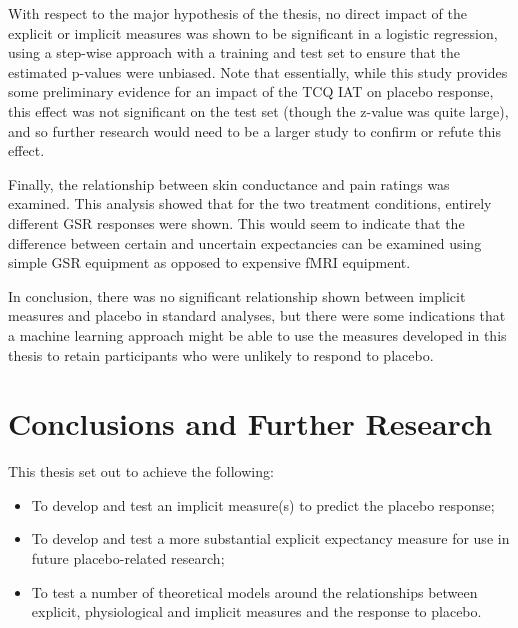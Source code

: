 With respect to the major hypothesis of the thesis, no direct impact of the explicit or implicit measures was shown to be significant in a logistic regression, using a step-wise approach with a training and test set to ensure that the estimated p-values were unbiased. Note that essentially, while this study provides some preliminary evidence for an impact of the TCQ IAT on placebo response, this effect was not significant on the test set (though the z-value was quite large), and so further research would need to be a larger study to confirm or refute this effect. 


Finally, the relationship between skin conductance and pain ratings was examined. This analysis showed that for the two treatment conditions, entirely different GSR responses were shown. This would seem to indicate that the difference between certain and uncertain expectancies can be examined using simple GSR equipment as opposed to expensive fMRI equipment. 

In conclusion, there was no significant relationship shown between implicit measures and placebo in standard analyses, but there were some indications that a machine learning approach might be able to use the measures developed in this thesis to retain participants who were unlikely to respond to placebo. 

\section{Conclusions and Further Research}

This thesis set out to achieve the following:

\begin{itemize}
\item To develop and test an implicit measure(s) to predict the placebo response;
\item To develop and test a more substantial explicit expectancy measure for use in future placebo-related research;
\item To test a number of theoretical models around the relationships between explicit, physiological and implicit measures and the response to placebo.
\end{itemize}

